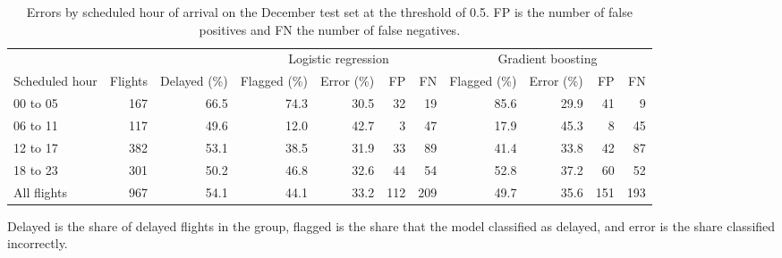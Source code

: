 \begin{table}[ht]
  \centering
  \caption{Errors by scheduled hour of arrival on the December test set at the threshold of 0.5. FP is the number of false positives and FN the number of false negatives.}
  \label{tab:error_time}
  \begin{threeparttable}
    \footnotesize
    \setlength{\tabcolsep}{2pt}
    \begin{tabular*}{\textwidth}{@{\extracolsep{\fill}}lrrrrrrrrrr@{}}
      \toprule
      & & & \multicolumn{4}{c}{Logistic regression} & \multicolumn{4}{c}{Gradient boosting} \\
      \cmidrule(lr){4-7} \cmidrule(lr){8-11}
      Scheduled hour & Flights & Delayed (\%) & Flagged (\%) & Error (\%) & FP & FN & Flagged (\%) & Error (\%) & FP & FN \\
      \midrule
      00 to 05 & 167 & 66.5 & 74.3 & 30.5 & 32 & 19 & 85.6 & 29.9 & 41 & 9 \\
      06 to 11 & 117 & 49.6 & 12.0 & 42.7 & 3 & 47 & 17.9 & 45.3 & 8 & 45 \\
      12 to 17 & 382 & 53.1 & 38.5 & 31.9 & 33 & 89 & 41.4 & 33.8 & 42 & 87 \\
      18 to 23 & 301 & 50.2 & 46.8 & 32.6 & 44 & 54 & 52.8 & 37.2 & 60 & 52 \\
      \midrule
      All flights & 967 & 54.1 & 44.1 & 33.2 & 112 & 209 & 49.7 & 35.6 & 151 & 193 \\
      \bottomrule
    \end{tabular*}
    \begin{tablenotes}
      \footnotesize
      \item Delayed is the share of delayed flights in the group, flagged is the share that the model classified as delayed, and error is the share classified incorrectly.
    \end{tablenotes}
  \end{threeparttable}
\end{table}
